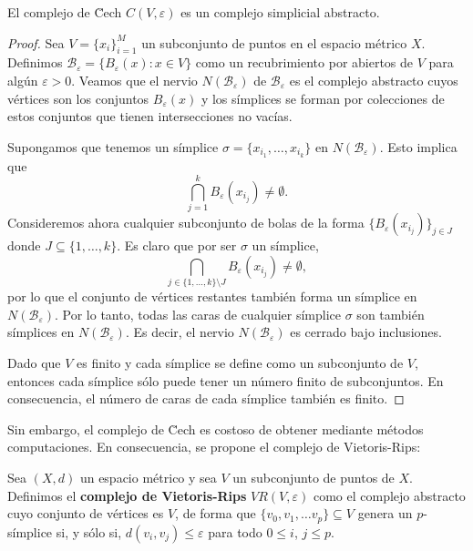 \begin{proposicion}
	El complejo de \u Cech \(C(V, \varepsilon)\) es un complejo simplicial abstracto.
\end{proposicion}
\begin{proof}
	Sea \( V = \{x_i\}_{i=1}^M \) un subconjunto de puntos en el espacio métrico \( X \). Definimos \( \mathcal{B}_\varepsilon = \{B_\varepsilon(x) : x \in V \} \) como un recubrimiento por abiertos de \( V \) para algún \(\varepsilon > 0\). Veamos que el nervio \( N(\mathcal{B}_\varepsilon) \) de \( \mathcal{B}_\varepsilon \) es el complejo abstracto cuyos vértices son los conjuntos \( B_\varepsilon(x) \) y los símplices se forman por colecciones de estos conjuntos que tienen intersecciones no vacías.
	
	Supongamos que tenemos un símplice \( \sigma = \{x_{i_1}, \ldots, x_{i_k}\} \) en \( N(\mathcal{B}_\varepsilon) \). Esto implica que
	\[
	\bigcap_{j=1}^k B_\varepsilon(x_{i_j}) \neq \emptyset.
	\]
	Consideremos ahora cualquier subconjunto de bolas de la forma  \(\{B_\varepsilon(x_{i_j})\}_{j \in J}\) donde \( J \subseteq \{1, \ldots, k\} \). Es claro que por ser $\sigma$ un símplice, 
	\[
	\bigcap_{j \in \{1, \ldots, k\} \setminus J} B_\varepsilon(x_{i_j}) \neq \emptyset,
	\]
	por lo que el conjunto de vértices restantes también forma un símplice en \( N(\mathcal{B}_\varepsilon) \). Por lo tanto, todas las caras de cualquier símplice \( \sigma \) son también símplices en \( N(\mathcal{B}_\varepsilon) \). Es decir, el nervio \( N(\mathcal{B}_\varepsilon) \) es cerrado bajo inclusiones.
	
	Dado que \( V \) es finito y cada símplice se define como un subconjunto de \( V \), entonces cada símplice sólo puede tener un número finito de subconjuntos. En consecuencia, el número de caras de cada símplice también es finito.
\end{proof}

Sin embargo, el complejo de \u Cech es costoso de obtener mediante métodos computaciones. En consecuencia, se propone el complejo de Vietoris-Rips:

\begin{definicion}
	Sea \((X,d)\) un espacio métrico y sea \(V\) un subconjunto de puntos de \(X\). Definimos el \textbf{complejo de Vietoris-Rips} \(VR(V,\varepsilon)\) como el complejo abstracto cuyo conjunto de vértices es \(V\), de forma que \(\{v_0, v_1, \dots v_p\} \subseteq V\) genera un \(p\)-símplice si, y sólo si, \(d(v_i,v_j) \leq \varepsilon\) para todo \(0 \leq i\), \(j \leq p\).
\end{definicion}

